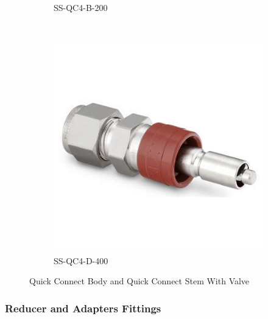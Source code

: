 \documentclass[a4paper,12pt,oneside]{article}
\begin{document}
\begin{appendices}
\begin{figure}[H]
\begin{subfigure}[b]{0.21\textwidth}
    \caption{SS-QC4-B-200}
    \end{subfigure}
    ~
    \begin{subfigure}[b]{0.21\textwidth}
    \centering
    \includegraphics[width=\textwidth]{appendix/img/interfaces/SS-QC4-B-400.jpg}
    \caption{SS-QC4-D-400}
    \end{subfigure}
    \caption{Quick Connect Body and Quick Connect Stem With Valve}
    \label{Appx:QC_fittings}
\end{figure}

\subsubsection{Reducer and Adapters Fittings}


\end{appendices}
\end{document}
